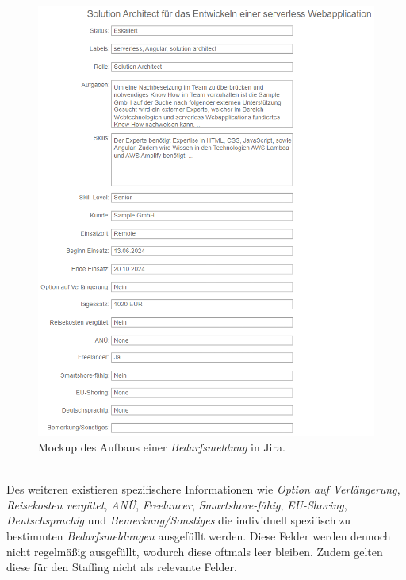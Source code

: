 \begin{figure}[H]%
	\centering  
	\includegraphics[scale=1]{Abbildungen/jiraBefore.png}
	\caption{Mockup des Aufbaus einer \emph{Bedarfsmeldung} in Jira.}
	\label{fig:jirabefore}
\end{figure}\mbox{} \\
Des weiteren existieren spezifischere Informationen wie \emph{Option auf Verlängerung}, \emph{Reisekosten vergütet}, \emph{ANÜ}, \emph{Freelancer}, \emph{Smartshore-fähig}, \emph{EU-Shoring}, \emph{Deutschsprachig} und \emph{Bemerkung/Sonstiges} die individuell spezifisch zu bestimmten \emph{Bedarfsmeldungen} ausgefüllt werden. Diese Felder werden dennoch nicht regelmäßig ausgefüllt, wodurch diese oftmals leer bleiben. Zudem gelten diese für den Staffing nicht als relevante Felder.
